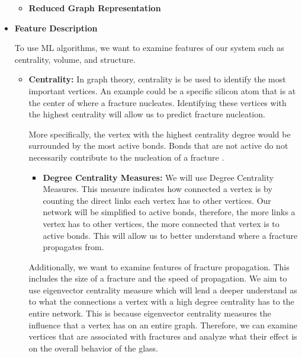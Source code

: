 \begin{itemize}
\begin{itemize}
\begin{tikzpicture}
    \end{tikzpicture}
    
\item \textbf{Reduced Graph Representation}

    
\end{itemize}


\item \textbf{Feature Description}
\bigskip

To use ML algorithms, we want to examine features of our system such as centrality, volume, and structure.

\begin{itemize}
    \item \textbf{Centrality:} In graph theory, centrality is be used to identify the most important vertices. An example could be a specific silicon atom that is at the center of where a fracture nucleates. Identifying these vertices with the highest centrality will allow us to predict fracture nucleation.
    
    \bigskip
    
    More specifically, the vertex with the highest centrality degree would be surrounded by the most active bonds. Bonds that are not active do not necessarily contribute to the nucleation of a fracture \cite{valera2018machine}.
    
    \begin{itemize}
        \item \textbf{Degree Centrality Measures:} We will use Degree Centrality Measures. This measure indicates how connected a vertex is by counting the direct links each vertex has to other vertices. Our network will be simplified to active bonds, therefore, the more links a vertex has to other vertices, the more connected that vertex is to active bonds. This will allow us to better understand where a fracture propagates from. 
    \end{itemize}
    
    \bigskip
    
    Additionally, we want to examine features of fracture propagation. This includes the size of a fracture and the speed of propagation. We aim to use eigenvector centrality measure which will lend a deeper understand as to what the connections a vertex with a high degree centrality has to the entire network. This is because eigenvector centrality measures the influence that a vertex has on an entire graph. Therefore, we can examine vertices that are associated with fractures and analyze what their effect is on the overall behavior of the glass.
    

\end{itemize}
\end{itemize}
